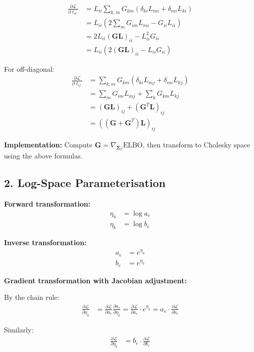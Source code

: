 \documentclass[11pt,a4paper]{article}
\newcommand{\ELBO}{\text{ELBO}}
\begin{document}
\begin{align}
\frac{\partial \mathcal{L}}{\partial \ell_{ii}} &= L_{ii} \sum_{k,m} G_{km} (\delta_{ki} L_{m i} + \delta_{mi} L_{ki})\\
&= L_{ii} \left(2 \sum_{m} G_{im} L_{mi} - G_{ii} L_{ii}\right)\\
&= 2 L_{ii} \left(\bm{G} \bm{L}\right)_{ii} - L_{ii}^2 G_{ii}\\
&= L_{ii} \left(2 (\bm{G} \bm{L})_{ii} - L_{ii} G_{ii}\right)
\end{align}

For off-diagonal:
\begin{align}
\frac{\partial \mathcal{L}}{\partial \ell_{ij}} &= \sum_{k,m} G_{km} (\delta_{ki} L_{mj} + \delta_{mi} L_{kj})\\
&= \sum_m G_{im} L_{mj} + \sum_k G_{km} L_{kj}\\
&= (\bm{G} \bm{L})_{ij} + (\bm{G}^T \bm{L})_{ij}\\
&= ((\bm{G} + \bm{G}^T) \bm{L})_{ij}
\end{align}

\textbf{Implementation:} Compute $\bm{G} = \nabla_{\bm{\Sigma}_\beta} \ELBO$, then transform to Cholesky space using the above formulas.

\subsection*{2. Log-Space Parameterisation}

\textbf{Forward transformation:}
\begin{align}
\eta_a &= \log a_e\\
\eta_b &= \log b_e
\end{align}

\textbf{Inverse transformation:}
\begin{align}
a_e &= e^{\eta_a}\\
b_e &= e^{\eta_b}
\end{align}

\textbf{Gradient transformation with Jacobian adjustment:}

By the chain rule:
\begin{align}
\frac{\partial \mathcal{L}}{\partial \eta_a} &= \frac{\partial \mathcal{L}}{\partial a_e} \frac{\partial a_e}{\partial \eta_a} = \frac{\partial \mathcal{L}}{\partial a_e} \cdot e^{\eta_a} = a_e \cdot \frac{\partial \mathcal{L}}{\partial a_e}
\end{align}

Similarly:
\begin{align}
\frac{\partial \mathcal{L}}{\partial \eta_b} &= b_e \cdot \frac{\partial \mathcal{L}}{\partial b_e}
\end{align}
\end{document}
